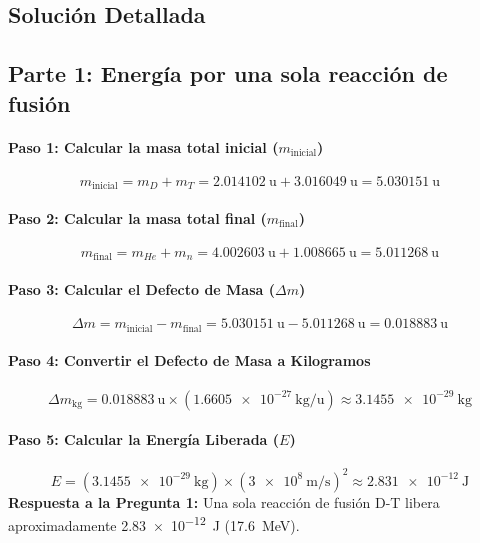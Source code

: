\documentclass[11pt,a4paper]{book}
\begin{document}
\subsection*{Solución Detallada}

\subsection*{Parte 1: Energía por una sola reacción de fusión}

\paragraph{Paso 1: Calcular la masa total inicial ($m_{\text{inicial}}$)}
\[ m_{\text{inicial}} = m_{D} + m_{T} = \SI{2.014102}{\atomicmassunit} + \SI{3.016049}{\atomicmassunit} = \SI{5.030151}{\atomicmassunit} \]

\paragraph{Paso 2: Calcular la masa total final ($m_{\text{final}}$)}
\[ m_{\text{final}} = m_{He} + m_n = \SI{4.002603}{\atomicmassunit} + \SI{1.008665}{\atomicmassunit} = \SI{5.011268}{\atomicmassunit} \]

\paragraph{Paso 3: Calcular el Defecto de Masa ($\Delta m$)}
\[ \Delta m = m_{\text{inicial}} - m_{\text{final}} = \SI{5.030151}{\atomicmassunit} - \SI{5.011268}{\atomicmassunit} = \SI{0.018883}{\atomicmassunit} \]

\paragraph{Paso 4: Convertir el Defecto de Masa a Kilogramos}
\[ \Delta m_{\text{kg}} = \SI{0.018883}{\atomicmassunit} \times (\SI{1.6605e-27}{\kilo\gram\per\atomicmassunit}) \approx \SI{3.1455e-29}{\kilo\gram} \]

\paragraph{Paso 5: Calcular la Energía Liberada ($E$)}
\[ E = (\SI{3.1455e-29}{\kilo\gram}) \times (\SI{3e8}{\meter\per\second})^2 \approx \SI{2.831e-12}{\joule} \]
\textbf{Respuesta a la Pregunta 1:} Una sola reacción de fusión D-T libera aproximadamente \SI{2.83e-12}{\joule} (\SI{17.6}{\mega\electronvolt}).
\end{document}
